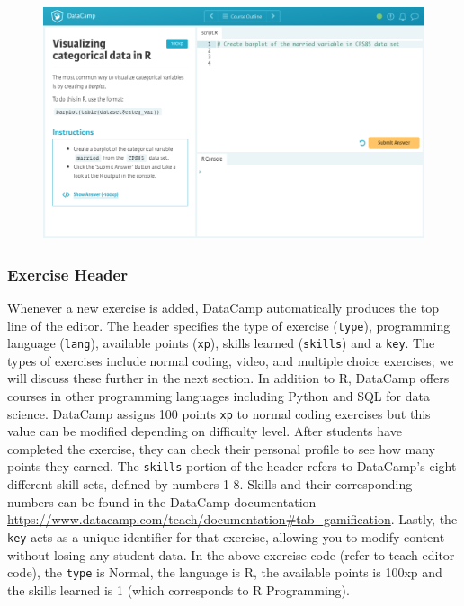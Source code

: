 \documentclass[12pt]{article}\usepackage[]{graphicx}\usepackage[]{color}
\begin{document}
\begin{figure}[h]
  \includegraphics[scale = 0.40] {preview.jpg}
\end{figure}
\subsubsection{Exercise Header}
Whenever a new exercise is added, DataCamp automatically produces the top line of the editor. The header specifies the type
of exercise (\texttt{type}), programming language (\texttt{lang}), available points (\texttt{xp}), skills learned (\texttt{skills}) and a \texttt{key}. 
The types of exercises include normal coding, video, and multiple choice exercises; we will discuss these further in the next section. In addition to R, DataCamp offers courses in other programming languages including Python and SQL for data science.
DataCamp assigns 100 points \texttt{xp} to normal coding exercises but this value can be modified depending on
difficulty level. After students have completed the exercise, they can check their personal profile to see how many points they earned.
The \texttt{skills} portion of the header refers to DataCamp's
eight different skill sets, defined by numbers 1-8. Skills and their corresponding numbers can be found in the DataCamp
documentation \url{https://www.datacamp.com/teach/documentation#tab_gamification}. 
Lastly, the \texttt{key} acts as a unique
identifier for that exercise, allowing you to modify content without losing any student data. 
In the above exercise code (refer to teach editor code), the \texttt{type} is Normal, the language is R, the available points is 100xp and the skills learned is 1 (which 
corresponds to R Programming). 
\end{document}

